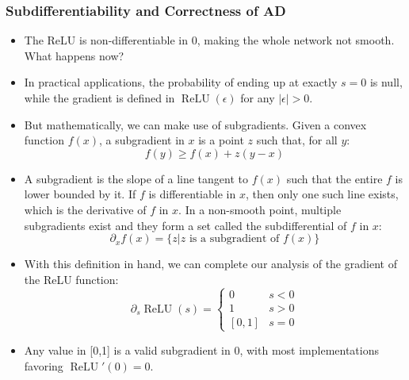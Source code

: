 \documentclass{article}
\begin{document}
    \subsubsection{Subdifferentiability and Correctness of AD}
    \begin{itemize}
        \item The ReLU is non-differentiable in 0, making the whole network not smooth. What happens now?
        \item In practical applications, the probability of ending up at exactly $s= 0$ is null, while the gradient is defined in $\operatorname{ReLU}(\epsilon)$ for any $|\epsilon| > 0$. 
        \item But mathematically, we can make use of subgradients. Given a convex function $f(x)$, a subgradient in $x$ is a point $z$ such that, for all $y$:
        \[f(y) \geq f(x) + z(y-x)\]
        \item A subgradient is the slope of a line tangent to $f(x)$ such that the entire $f$ is lower bounded by it. 
        If $f$ is differentiable in $x$, then only one such line exists, which is the derivative of $f$ in $x$. 
        In a non-smooth point, multiple subgradients exist and they form a set called the subdifferential of $f$ in $x$:
        \[\partial_x f(x) = \{ z | z \text{ is a subgradient of $f(x)$} \} \]
        \item With this definition in hand, we can complete our analysis of the gradient of the ReLU function:
        \[\partial _s \operatorname{ReLU}(s) = 
        \begin{cases}
            {0}  &s < 0 \\
            {1}  &s > 0 \\
            [0,1] &s = 0
        \end{cases}\]
        \item Any value in [0,1] is a valid subgradient in 0, with most implementations favoring $\operatorname{ReLU}'(0) = 0$.
    \end{itemize}
\end{document}
